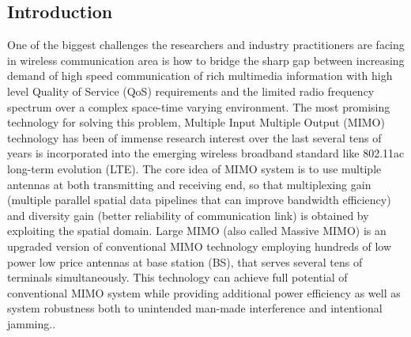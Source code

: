 \documentclass[12pt, draftclsnofoot, onecolumn]{IEEEtran}
\begin{document}
\begin{spacing}{2}
\section{Introduction}
% 
% 
% 
% 

 
  One of the biggest challenges the researchers and industry practitioners are facing in wireless communication area is how to bridge the sharp gap between increasing demand of high speed communication of rich multimedia information with high level Quality of Service (QoS) requirements and the limited radio frequency spectrum over a complex space-time varying environment. The most promising technology for solving this problem, Multiple Input Multiple Output (MIMO) technology has been of immense research interest over the last several tens of years is incorporated into the emerging wireless broadband standard like 802.11ac\cite{IEEE802.11ac} long-term evolution (LTE)\cite{3GLTE}.  The core idea of MIMO system is to use multiple antennas at both transmitting and receiving end, so that multiplexing gain (multiple parallel spatial data pipelines that can improve bandwidth efficiency) and diversity gain (better reliability of communication link) is obtained by exploiting the spatial domain. Large MIMO (also called Massive MIMO) is an upgraded version of conventional MIMO technology employing hundreds of low power low price antennas at base station (BS), that serves several tens of terminals simultaneously. This technology can achieve full potential of conventional MIMO system while providing additional power efficiency as well as system robustness both to unintended man-made interference and intentional jamming.\cite{rusek2013scaling}\cite{larsson2014massive}. 
    

\end{spacing}
\end{document}

